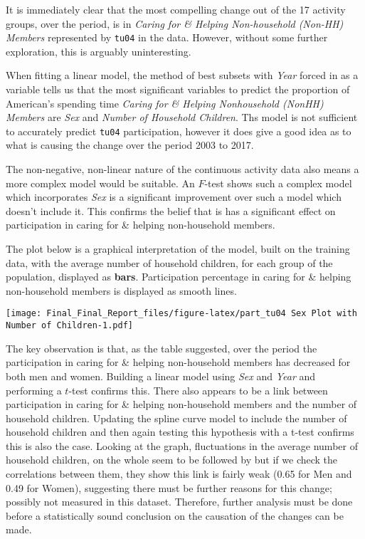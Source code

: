 \documentclass[11pt,]{article}
\begin{document}
It is immediately clear that the most compelling change out of the 17
activity groups, over the period, is in \emph{Caring for \& Helping
Non-household (Non-HH) Members} represented by \texttt{tu04} in the
data. However, without some further exploration, this is arguably
uninteresting.

When fitting a linear model, the method of best subsets with \emph{Year}
forced in as a variable tells us that the most significant variables to
predict the proportion of American's spending time \emph{Caring for \&
Helping Nonhousehold (NonHH) Members} are \emph{Sex} and \emph{Number of
Household Children}. Ths model is not sufficient to accurately predict
\texttt{tu04} participation, however it does give a good idea as to what
is causing the change over the period 2003 to 2017.

The non-negative, non-linear nature of the continuous activity data also
means a more complex model would be suitable. An \(F\)-test shows such a
complex model which incorporates \emph{Sex} is a significant improvement
over such a model which doesn't include it. This confirms the belief
that is has a significant effect on participation in caring for \&
helping non-household members.

The plot below is a graphical interpretation of the model, built on the
training data, with the average number of household children, for each
group of the population, displayed as \textbf{bars}. Participation
percentage in caring for \& helping non-household members is displayed
as smooth lines.

\texttt{[image: Final\_Final\_Report\_files/figure-latex/part\_tu04 Sex Plot with Number of Children-1.pdf]}

The key observation is that, as the table suggested, over the period the
participation in caring for \& helping non-household members has
decreased for both men and women. Building a linear model using
\emph{Sex} and \emph{Year} and performing a \(t\)-test confirms this.
There also appears to be a link between participation in caring for \&
helping non-household members and the number of household children.
Updating the spline curve model to include the number of household
children and then again testing this hypothesis with a t-test confirms
this is also the case. Looking at the graph, fluctuations in the average
number of household children, on the whole seem to be followed by but if
we check the correlations between them, they show this link is fairly
weak (0.65 for Men and 0.49 for Women), suggesting there must be further
reasons for this change; possibly not measured in this dataset.
Therefore, further analysis must be done before a statistically sound
conclusion on the causation of the changes can be made.
\end{document}
